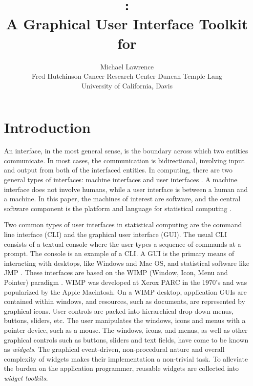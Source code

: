 \documentclass[article,shortnames]{jss}
\author{Michael Lawrence\\
Fred Hutchinson Cancer Research Center \And Duncan Temple Lang\\
University of California, Davis}
\title{\pkg{RGtk2}:\\A Graphical User Interface Toolkit for
\proglang{R}}
\begin{document}
\section{Introduction}


An interface, in the most general sense, is the boundary across which
two
entities communicate. In most cases, the communication is
bidirectional, 
involving input and output from both of the interfaced entities. In
computing,
there are two general types of interfaces: machine interfaces and user
interfaces
\citep{gui-cli}. A machine interface does not involve humans, while a 
user interface is between a human and a machine. In this paper, the
machines of
interest are software, and the central software component is the
platform and language for statistical computing \citep{R}.

Two common types of user interfaces in statistical computing are the
command line interface (CLI) and the graphical user interface
(GUI). The usual CLI consists of a textual console where the user
types a sequence of commands at a prompt. The  console is
an example of a CLI. A GUI is the primary means of interacting with
desktops, like Windows and Mac OS, and statistical software like JMP
\citep{JMP}. These interfaces are based on the WIMP (Window, Icon,
Menu and Pointer) paradigm \citep{WIMP}. WIMP was developed at Xerox
PARC in the 1970's and was popularized by the Apple Macintosh. On a
WIMP desktop, application GUIs are contained within windows, and
resources, such as documents, are represented by graphical icons.
User controls are packed into hierarchical drop-down menus, buttons,
sliders, etc. The user manipulates the windows, icons and menus with a
pointer device, such as a mouse.  The windows, icons, and menus, as
well as other graphical controls such as buttons, sliders and text
fields, have come to be known as \emph{widgets}. The graphical
event-driven, non-procedural nature and overall complexity of widgets
makes their implementation a non-trivial task.  To alleviate the
burden on the application programmer, reusable widgets are collected
into \emph{widget toolkits}.
\end{document}
